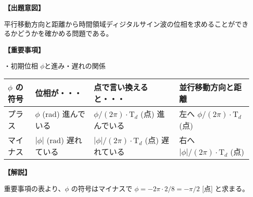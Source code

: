 \noindent \textbf{【出題意図】}

\bigskip
\noindent 平行移動方向と距離から時間領域ディジタルサイン波の位相を求めることができるかどうかを確かめる問題である。

\vspace{1em}
\noindent \textbf{【重要事項】}

\noindent ・初期位相 $\phi$と進み・遅れの関係

\medskip
\begin{center}
\small
\begin{tabularx}{0.9\fbwidth}{|X|X|X|X|}
\hline
$\phi$ の符号&  位相が・・・   & 点で言い換えると・・・   & 並行移動方向と距離 \\
\hline
プラス &  $\phi$ (rad) 進んでいる & $\phi/(2\pi) \cdot \textrm{T}_d$ (点) 進んでいる & 左へ $\phi/(2\pi) \cdot \textrm{T}_d$ (点) \\
\hline
マイナス &  $|\phi|$ (rad) 遅れている & $|\phi|/(2\pi) \cdot \textrm{T}_d$ (点) 遅れている & 右へ $|\phi|/(2\pi) \cdot \textrm{T}_d$ (点) \\
\hline
\end{tabularx}
\end{center}

\bigskip

\vspace{1em}
\noindent \textbf{【解説】}

\bigskip
\noindent 重要事項の表より、$\phi$ の符号はマイナスで $\phi = -2\pi \cdot 2 / 8 = -\pi/2$ [点] と求まる。
